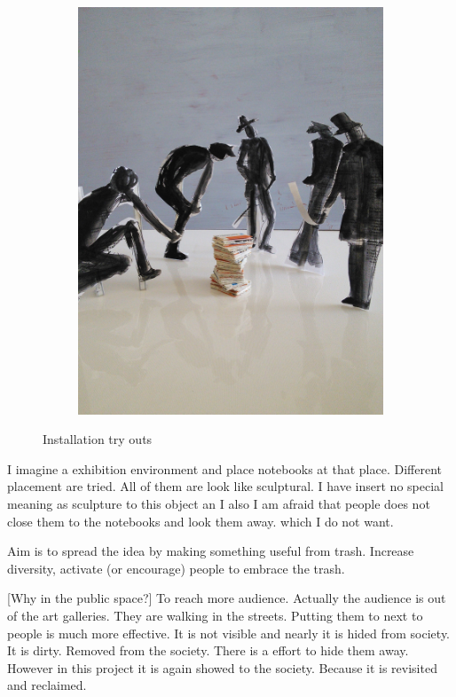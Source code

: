 \begin{figure}
\begin{subfigure}[b]{0.3\textwidth}
        \includegraphics[width=\textwidth]{project_graphics/exhibition3.jpg}
        \label{fig:exhibition3}
    \end{subfigure}
    \caption{Installation try outs}
    \label{fig:exhibition}
\end{figure}

I imagine a exhibition environment and place notebooks at that place. Different placement are tried. All of them are look like sculptural. I have insert no special meaning as sculpture to this object an I also I am afraid that people does not close them to the notebooks and look them away. which I do not want. 

Aim is to spread the idea by making something useful from trash. Increase diversity, activate (or encourage) people to embrace the trash.

[Why in the public space?] To reach more audience. Actually the audience is out of the art galleries. They are walking in the streets. Putting them to next to people is much more effective. It is not visible and nearly it is hided from society. It is dirty. Removed from the society. There is a effort to hide them away. However in this project it is again showed to the society. Because it is revisited and reclaimed. 

